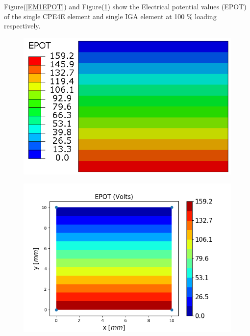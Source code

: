 \documentclass[11pt]{article}
\begin{document}
Figure(\ref{EM1EPOT}) and Figure(\ref{EM1EPOT_IGA}) show the Electrical potential values (EPOT) of the single CPE4E element and single IGA element at 100 \% loading respectively. \\
\begin{figure}[H]
	\centering
	\begin{minipage}{.5\textwidth}
		\centering
		\includegraphics[width=1\linewidth]{EM1EPOT.png}
		\label{EM1EPOT}
	\end{minipage}%
	\begin{minipage}{.6\textwidth}
		\centering
		\includegraphics[width=1\linewidth]{EM1EPOT_IGA.png}
		\label{EM1EPOT_IGA}
	\end{minipage}
\end{figure}
\end{document}

